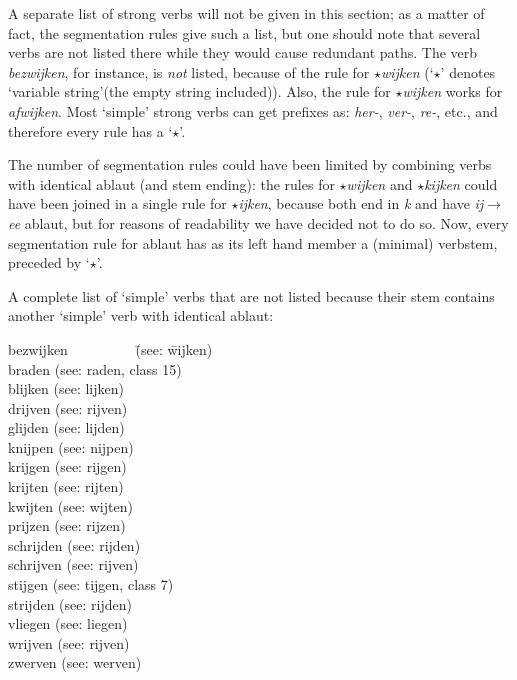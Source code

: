 A separate list of strong verbs will not be given in this section;
as a matter of fact, the segmentation rules give such a list, but one should
note that several verbs are not listed there while they would cause redundant 
paths. The verb {\em bezwijken}, for instance, is {\em not}
listed, because of the rule
for {\em $\star$wijken} (`$\star$' 
denotes `variable string'(the empty string included)). Also, the rule for 
{\em $\star$wijken} works for {\em afwijken}. Most `simple' strong verbs can 
get prefixes as: {\em her-}, {\em ver-}, {\em re-}, etc., and therefore every 
rule has a `$\star$'.

The number of segmentation rules could have been limited by combining verbs
with identical ablaut (and stem ending): the rules for {\em $\star$wijken} and 
{\em $\star$kijken}
could have been joined in a single rule for {\em $\star$ijken}, 
because both end in {\em k} and have {\em ij}$\longrightarrow${\em ee} 
ablaut, but for 
reasons of readability we have decided not 
to do so. Now, every segmentation rule for ablaut has as its left hand member
a (minimal) verbstem, preceded by `$\star$'.

A complete list of `simple' verbs that are not listed because their stem
contains another `simple' verb with identical ablaut:

\begin{tabbing}
      bezwijken  \ \ \ \ \ \ \ \ \    \=  (see: \=  wijken) \\
      braden      \>  (see: \>  raden, class 15) \\
      blijken     \>  (see: \>  lijken) \\
      drijven     \>  (see: \>  rijven) \\
      glijden     \>  (see: \>  lijden) \\
      knijpen     \>  (see: \>  nijpen) \\
      krijgen     \>  (see: \>  rijgen) \\
      krijten     \>  (see: \>  rijten) \\
      kwijten     \>  (see: \>  wijten) \\
      prijzen     \>  (see: \>  rijzen) \\
      schrijden   \>  (see: \>  rijden) \\
      schrijven   \>  (see: \>  rijven) \\
      stijgen     \>  (see: \>  tijgen, class 7) \\
      strijden    \>  (see: \>  rijden) \\
      vliegen     \>  (see: \>  liegen) \\
      wrijven     \>  (see: \>  rijven) \\
      zwerven     \>  (see: \>  werven) \\
\end{tabbing}

